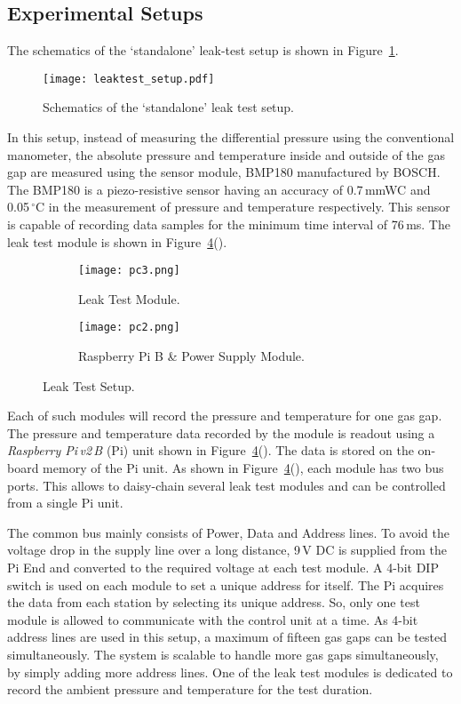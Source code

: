 \subsection{Experimental Setups}
The schematics of the `standalone' leak-test setup is shown in Figure~\ref{fig:schematics}. 
\begin{figure}
  \centering
  \texttt{[image: leaktest\_setup.pdf]}
  \caption{Schematics of the `standalone' leak test setup.}
  \label{fig:schematics}
\end{figure}
In this setup, instead of measuring the differential pressure using the conventional manometer, the absolute pressure and temperature inside and outside of the gas gap are measured using the sensor module, BMP180 manufactured by BOSCH\cite{bmp180}. The BMP180 is a piezo-resistive sensor having an accuracy of 0.7\,mmWC and 0.05\,$^{\circ}$C in the measurement of pressure and temperature respectively. This sensor is capable of recording data samples for the minimum time interval of 76\,ms. The leak test module is shown in Figure~\ref{fig:setup}(). 
\begin{figure}
  \centering
  \begin{subfigure}[b]{0.34\textwidth}
    \texttt{[image: pc3.png]}
    \caption{Leak Test Module.}
    \label{fig:pc3}
  \end{subfigure}
  \begin{subfigure}[b]{0.64\textwidth}
    \texttt{[image: pc2.png]}
    \caption{Raspberry Pi B \& Power Supply Module.}
    \label{fig:pc2}
  \end{subfigure}
  \caption{Leak Test Setup.}
  \label{fig:setup}
\end{figure}
Each of such modules will record the pressure and temperature for one gas gap. The pressure and temperature data recorded by the module is readout using a \textit{Raspberry Pi\,v2\,B} (Pi) unit\cite{rpi} shown in Figure~\ref{fig:setup}(). The data is stored on the on-board memory of the Pi unit. As shown in Figure~\ref{fig:setup}(), each module has two bus ports. This allows to daisy-chain several leak test modules and can be controlled from a single Pi unit.

The common bus mainly consists of Power, Data and Address lines. To avoid the voltage drop in the supply line over a long distance, 9\,V DC is supplied from the Pi End and converted to the required voltage at each test module. A 4-bit DIP switch is used on each module to set a unique address for itself. The Pi acquires the data from each station by selecting its unique address. So, only one test module is allowed to communicate with the control unit at a time. As 4-bit address lines are used in this setup, a maximum of fifteen gas gaps can be tested simultaneously. The system is scalable to handle more gas gaps simultaneously, by simply adding more address lines. One of the leak test modules is dedicated to record the ambient pressure and temperature for the test duration.

